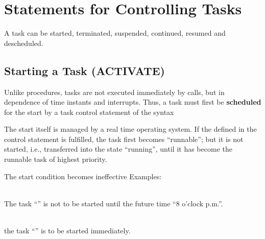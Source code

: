 


\section{Statements for Controlling Tasks}    %
\label{sec_tasking_statements}

A task can be started, terminated, suspended, continued, resumed and
descheduled.

\subsection{Starting a Task (ACTIVATE)}   %
\label{sec_task_activate}

Unlike procedures, tasks are not executed immediately by calls, but in
dependence of time instants and interrupts. Thus, a task must first be
{\bf scheduled} for the start by a task control statement of the
syntax

\begin{grammarframe}

\end{grammarframe}

The start itself is managed by a real time operating system. If
the  defined in the control statement is fulfilled,
the task first becomes ``runnable''; but it is not started, i.e.,
transferred into the state ``running'', until it has become the runnable
task of highest priority. %

The start condition becomes ineffective 
Examples:

\\
The task ``'' is not to be started until the
future time ``8 o'clock p.m.''.

\\ 
the task ``'' is to be started immediately.

